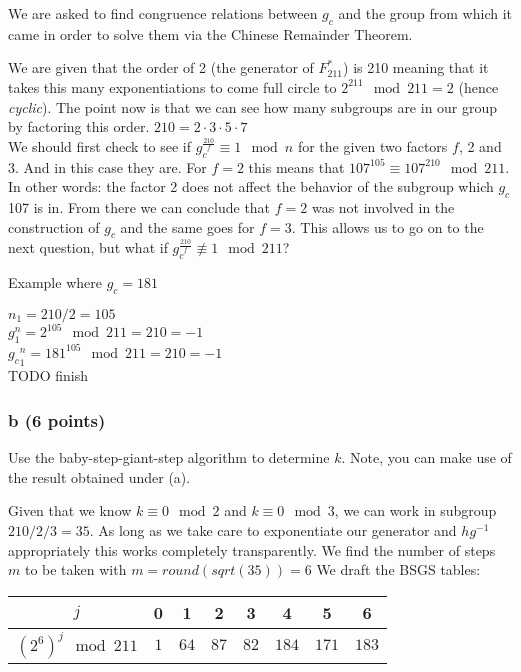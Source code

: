 \documentclass{article}
\begin{document}
We are asked to find congruence relations between $g_c$ and the group from
which it came in order to solve them via the Chinese Remainder Theorem.

We are given that the order of 2 (the generator of $F_{211}^{*}$) is 210
meaning that it takes this many exponentiations to come full circle to
$2^{211} \mod 211 = 2$ (hence \textit{cyclic}).
The point now is that we can see how many subgroups are in our group by
factoring this order.
$210 = 2 \cdot 3 \cdot 5 \cdot 7$ \\

We should first check to see if $g_c^{\frac{210}{f}} \equiv 1 \mod n$
for the given two factors $f$, 2 and 3. And in this case they are.
For $f=2$ this means that $107^{105} \equiv 107^{210} \mod 211$.
In other words: the factor 2 does not affect the behavior of the subgroup which
$g_c$ 107 is in. From there we can conclude that $f=2$ was not involved in the
construction of $g_c$ and the same goes for $f=3$.
This allows us to go on to the next question, but what if $g_c^{\frac{210}{f}}
\not \equiv 1 \mod 211$?

Example where $g_c=181$

$n_1 = 210/2 = 105$ \\
$g^n_1 = 2^{105} \mod 211 = 210 = -1$ \\
${g_c}^n_1 = 181^{105} \mod 211 = 210 = -1$ \\
TODO finish

\subsubsection{b (6 points)}
Use the baby-step-giant-step algorithm to determine $k$.
Note, you can make use of the result obtained
under (a).

Given that we know $k \equiv 0 \mod 2$ and $k \equiv 0 \mod 3$, we can work in
subgroup $210/2/3=35$.
As long as we take care to exponentiate our generator and
$hg^{-1}$ appropriately this works completely transparently.
We find the number of steps $m$ to be taken with $m = round(sqrt(35)) = 6$
We draft the BSGS tables:

\begin{tabular}{|c|c|c|c|c|c|c|c|}
\hline
$j $ & 0 & 1 & 2 & 3 & 4 & 5 & 6  \\
\hline
$(2^6)^j \mod 211$ & $1$ & $64$ & $87$ & $82$ & $184$ & $171$ & $183$ \\
\hline
\end{tabular}
\end{document}
